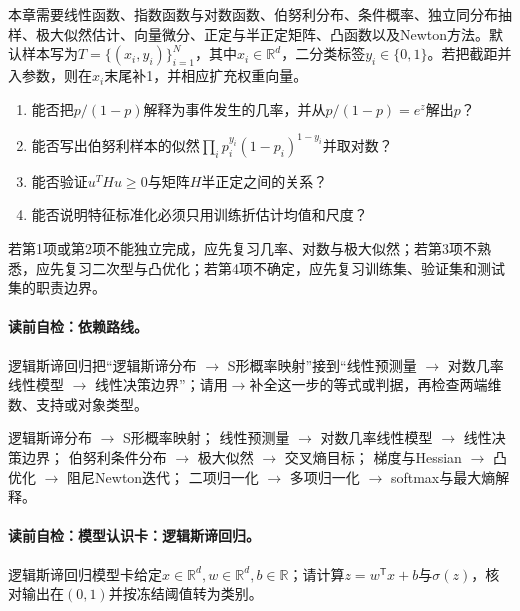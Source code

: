 \begin{prerequisitebox}
本章需要线性函数、指数函数与对数函数、伯努利分布、条件概率、独立同分布抽样、极大似然估计、向量微分、正定与半正定矩阵、凸函数以及Newton方法。默认样本写为$T=\{(x_i,y_i)\}_{i=1}^{N}$，其中$x_i\in\mathbb R^d$，二分类标签$y_i\in\{0,1\}$。若把截距并入参数，则在$x_i$末尾补1，并相应扩充权重向量。
\end{prerequisitebox}

\label{struct:V2-C05-CH03}
\begin{precheckbox}
\begin{enumerate}[leftmargin=2.2em]
  \item 能否把$p/(1-p)$解释为事件发生的几率，并从$p/(1-p)=e^z$解出$p$？
  \item 能否写出伯努利样本的似然$\prod_i p_i^{y_i}(1-p_i)^{1-y_i}$并取对数？
  \item 能否验证$u^THu\geq0$与矩阵$H$半正定之间的关系？
  \item 能否说明特征标准化必须只用训练折估计均值和尺度？
\end{enumerate}
若第1项或第2项不能独立完成，应先复习几率、对数与极大似然；若第3项不熟悉，应先复习二次型与凸优化；若第4项不确定，应先复习训练集、验证集和测试集的职责边界。
\end{precheckbox}

\label{struct:V2-C05-CH04}
\paragraph{读前自检：依赖路线。}逻辑斯谛回归把“逻辑斯谛分布 $\to$ S形概率映射”接到“线性预测量 $\to$ 对数几率线性模型 $\to$ 线性决策边界”；请用$\to$补全这一步的等式或判据，再检查两端维数、支持或对象类型。\par

\begin{dependencybox}
逻辑斯谛分布 $\to$ S形概率映射；
线性预测量 $\to$ 对数几率线性模型 $\to$ 线性决策边界；
伯努利条件分布 $\to$ 极大似然 $\to$ 交叉熵目标；
梯度与Hessian $\to$ 凸优化 $\to$ 阻尼Newton迭代；
二项归一化 $\to$ 多项归一化 $\to$ softmax与最大熵解释。
\end{dependencybox}

\paragraph{读前自检：模型认识卡：逻辑斯谛回归。}逻辑斯谛回归模型卡给定$x\in\mathbb R^d,w\in\mathbb R^d,b\in\mathbb R$；请计算$z=w^{\mathsf T}x+b$与$\sigma(z)$，核对输出在$(0,1)$并按冻结阈值转为类别。\par

